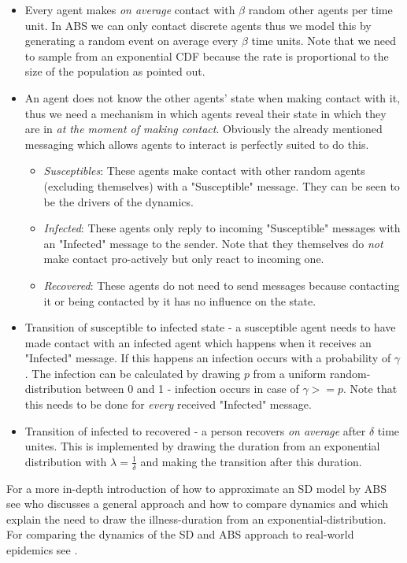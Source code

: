 \begin{itemize}
	\item Every agent makes \textit{on average} contact with $\beta$ random other agents per time unit. In ABS we can only contact discrete agents thus we model this by generating a random event on average every $\beta$ time units. Note that we need to sample from an exponential CDF because the rate is proportional to the size of the population as \cite{borshchev_system_2004} pointed out.
	
	\item An agent does not know the other agents' state when making contact with it, thus we need a mechanism in which agents reveal their state in which they are in \textit{at the moment of making contact}. Obviously the already mentioned messaging which allows agents to interact is perfectly suited to do this.
	\begin{itemize}
		\item \textit{Susceptibles}: These agents make contact with other random agents (excluding themselves) with a "Susceptible" message. They can be seen to be the drivers of the dynamics.
		\item \textit{Infected}: These agents only reply to incoming "Susceptible" messages with an "Infected" message to the sender. Note that they themselves do \textit{not} make contact pro-actively but only react to incoming one. 
		\item \textit{Recovered}: These agents do not need to send messages because contacting it or being contacted by it has no influence on the state.
	\end{itemize}
	
	\item Transition of susceptible to infected state - a susceptible agent needs to have made contact with an infected agent which happens when it receives an "Infected" message. If this happens an infection occurs with a probability of $\gamma$. The infection can be calculated by drawing $p$ from a uniform random-distribution between 0 and 1 - infection occurs in case of $\gamma >= p $. Note that this needs to be done for \textit{every} received "Infected" message.
	
	\item Transition of infected to recovered - a person recovers \textit{on average} after $\delta$ time unites. This is implemented by drawing the duration from an exponential distribution \cite{borshchev_system_2004} with $\lambda = \frac{1}{\delta}$ and making the transition after this duration.
\end{itemize}

For a more in-depth introduction of how to approximate an SD model by ABS see \cite{macal_agent-based_2010} who discusses a general approach and how to compare dynamics and \cite{borshchev_system_2004} which explain the need to draw the illness-duration from an exponential-distribution. For comparing the dynamics of the SD and ABS approach to real-world epidemics see \cite{ahmed_variance_2013}.